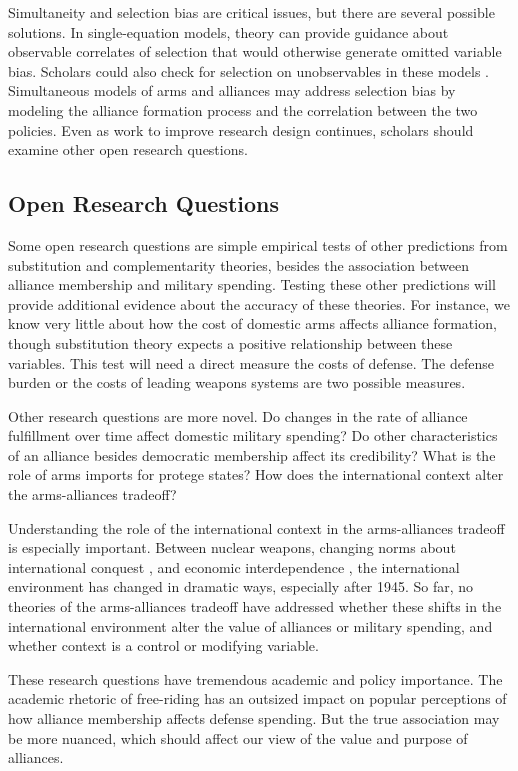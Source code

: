 \documentclass[12pt]{article}
\begin{document}
Simultaneity and selection bias are critical issues, but there are several possible solutions. In single-equation models, theory can provide guidance about observable correlates of selection that would otherwise generate omitted variable bias. Scholars could also check for selection on unobservables in these models \citep{Chaudoinetal2016}. Simultaneous models of arms and alliances may address selection bias by modeling the alliance formation process and the correlation between the two policies. Even as work to improve research design continues, scholars should examine other open research questions. 


\subsection*{Open Research Questions} 

Some open research questions are simple empirical tests of other predictions from substitution and complementarity theories, besides the association between alliance membership and military spending. Testing these other predictions will provide additional evidence about the accuracy of these theories. For instance, we know very little about how the cost of domestic arms affects alliance formation, though substitution theory expects a positive relationship between these variables. This test will need a direct measure the costs of defense. The defense burden or the costs of leading weapons systems are two possible measures. 

Other research questions are more novel. Do changes in the rate of alliance fulfillment over time affect domestic military spending? Do other characteristics of an alliance besides democratic membership affect its credibility? What is the role of arms imports for protege states? How does the international context alter the arms-alliances tradeoff? 

Understanding the role of the international context in the arms-alliances tradeoff is especially important. Between nuclear weapons, changing norms about international conquest \citep{Fazal2011}, and economic interdependence \citep{Frieden2006}, the international environment has changed in dramatic ways, especially after 1945. So far, no theories of the arms-alliances tradeoff have addressed whether these shifts in the international environment alter the value of alliances or military spending, and whether context is a control or modifying variable. 

These research questions have tremendous academic and policy importance. The academic rhetoric of free-riding has an outsized impact on popular perceptions of how alliance membership affects defense spending. But the true association may be more nuanced, which should affect our view of the value and purpose of alliances.  
\end{document}
